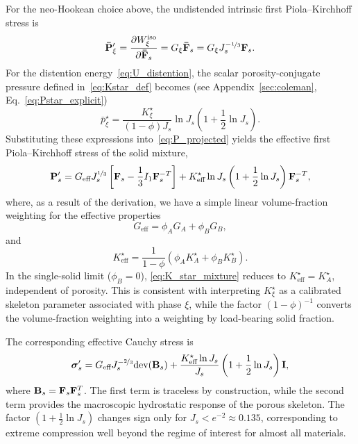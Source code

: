 \documentclass[11pt]{article}
\begin{document}
For the neo-Hookean choice above, the undistended intrinsic first Piola--Kirchhoff stress is
%
\[
  \mathbf{\bar P}'_\xi = \frac{\partial W^{\text{iso}}_\xi}{\partial \mathbf{\bar F}_s} = G_\xi \mathbf{\bar F}_s = G_\xi J_s^{-\nicefrac{1}{3}}\mathbf{F}_s.
\]
%
For the distention energy~\eqref{eq:U_distention}, the scalar porosity-conjugate pressure defined in~\eqref{eq:Kstar_def} becomes (see Appendix~\ref{sec:coleman}, Eq.~\eqref{eq:Pstar_explicit})
%
\begin{equation}
  \bar p^\star_\xi = \frac{K_\xi^\star}{(1-\phi)J_s}\ln J_s\left(1+\frac{1}{2}\ln J_s\right).
\end{equation}
%
Substituting these expressions into~\eqref{eq:P_projected} yields the effective first Piola--Kirchhoff stress of the solid mixture,
%
\begin{align*}
  \mathbf{P}'_s = G_{\text{eff}} J_s^{\nicefrac{1}{3}}\left[\mathbf{F}_s - \frac{1}{3}I_1\mathbf{F}_s^{-T}\right] + K_{\text{eff}}^\star\ln J_s\left(1+\frac{1}{2}\ln J_s\right)\mathbf{F}_s^{-T},
\end{align*}
%
where, as a result of the derivation, we have a simple linear volume-fraction weighting for the effective properties
\begin{equation}
  G_{\text{eff}} = \phi_A G_A + \phi_B G_B,
\end{equation}
%
and
\begin{equation}
  K^\star_{\text{eff}} = \frac{1}{1-\phi}\left(\phi_A K_A^\star + \phi_B K_B^\star\right).
  \label{eq:K_star_mixture}
\end{equation}
In the single-solid limit ($\phi_B = 0$), \eqref{eq:K_star_mixture} reduces to $K_{\text{eff}}^\star = K_A^\star$, independent of porosity.  This is consistent with interpreting $K_\xi^\star$ as a calibrated skeleton parameter associated with phase $\xi$, while the factor $(1-\phi)^{-1}$ converts the volume-fraction weighting into a weighting by load-bearing solid fraction.

The corresponding effective Cauchy stress is
%
\begin{align*}
  \boldsymbol{\sigma}'_s = G_{\text{eff}}J_s^{-\nicefrac{2}{3}}\mbox{dev}(\mathbf{B}_s) + \frac{K_{\text{eff}}^\star\ln J_s}{J_s}\left(1+\frac{1}{2}\ln J_s\right)\mathbf{I},
\end{align*}
%
where $\mathbf{B}_s = \mathbf{F}_s\mathbf{F}_s^T$.  The first term is traceless by construction, while the second term provides the macroscopic hydrostatic response of the porous skeleton.  The factor $\left(1+\frac{1}{2}\ln J_s\right)$ changes sign only for $J_s < e^{-2} \approx 0.135$, corresponding to extreme compression well beyond the regime of interest for almost all materials.
\end{document}
